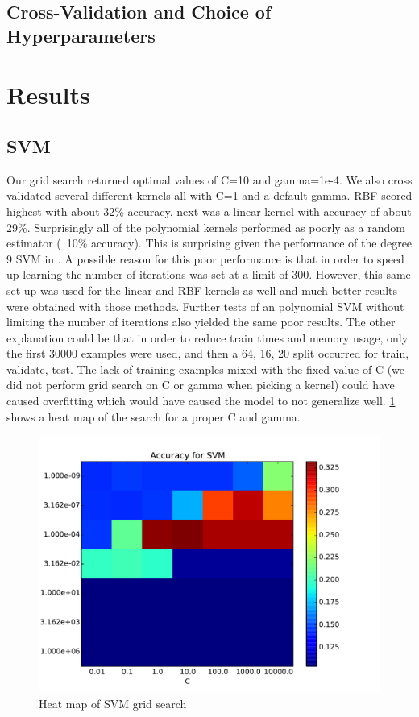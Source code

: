 \documentclass[conference]{IEEEtran}
\begin{document}
\subsection{Cross-Validation and Choice of Hyperparameters}

\section{Results}
\subsection{SVM}
Our grid search returned optimal values of C=10 and gamma=1e-4. We also cross validated several different kernels all with C=1 and a default gamma. RBF scored highest with about 32\% accuracy, next was a linear kernel with accuracy of about 29\%. Surprisingly all of the polynomial kernels performed as poorly as a random estimator (~10\% accuracy). This is surprising given the performance of the degree 9 SVM in \cite{LeCunn98}. A possible reason for this poor performance is that in order to speed up learning the number of iterations was set at a limit of 300. However, this same set up was used for the linear and RBF kernels as well and much better results were obtained with those methods. Further tests of an polynomial SVM without limiting the number of iterations also yielded the same poor results. The other explanation could be that in order to reduce train times and memory usage, only the first 30000 examples were used, and then a 64, 16, 20 split occurred for train, validate, test. The lack of training examples mixed with the fixed value of C (we did not perform grid search on C or gamma when picking a kernel) could have caused overfitting which would have caused the model to not generalize well. \ref{SVMGrid} shows a heat map of the search for a proper C and gamma. 

\begin{figure}[h]
	\centering
	\includegraphics[scale=0.4]{SVM_grid_search.pdf}
	\caption{Heat map of SVM grid search}
	\label{SVMGrid}
\end{figure}
\end{document}
